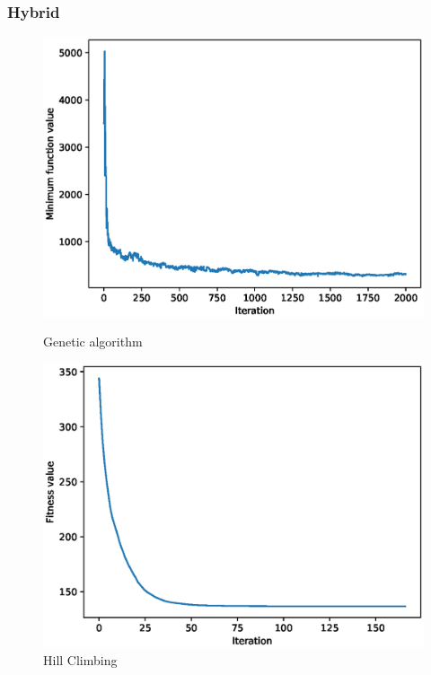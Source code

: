 \documentclass{article}
\begin{document}
\subsubsection{Hybrid}
\begin{figure}[!htbp]
	\centering
	\begin{minipage}{.48\textwidth}
		\centering
		\includegraphics[scale=.4]{experiment_3a_rosenbrock/ga_min_eval_0.eps}
		\caption{Genetic algorithm}
	\end{minipage}\hfill
	\begin{minipage}{.48\textwidth}
		\centering
		\includegraphics[scale=.4]{experiment_3a_rosenbrock/hc_max_fitness_0.eps}
		\caption{Hill Climbing}
	\end{minipage}\hfill
\end{figure}
\FloatBarrier
\end{document}
